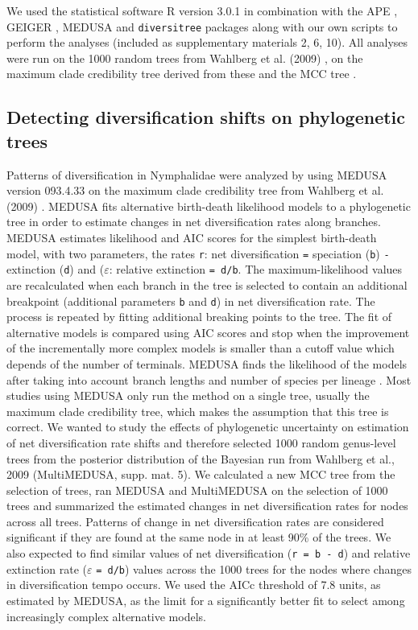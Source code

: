 \documentclass[10pt]{article}
\begin{document}
We used the statistical software R version 3.0.1 \cite{r2013} in combination
with the APE \cite{popescu2012}, GEIGER \cite{harmon2008}, MEDUSA
\cite{alfaro2009} and
\texttt{diversitree} \cite{fitzjohn2012} packages along with our own scripts to
perform the analyses (included as supplementary materials 2, 6, 10). All
analyses were run on the 1000 random trees from Wahlberg et al. (2009)
\cite{wahlberg2009}, on the maximum clade credibility tree derived from these and
the MCC tree \cite{wahlberg2009}.


\subsection*{Detecting diversification shifts on phylogenetic trees}

Patterns of diversification in Nymphalidae were analyzed by using MEDUSA
version 093.4.33 \cite{alfaro2009} on the maximum clade credibility tree from
Wahlberg et al. (2009) \cite{wahlberg2009}. MEDUSA fits alternative birth-death
likelihood models to a phylogenetic tree in order to estimate changes in
net diversification rates along branches. MEDUSA estimates likelihood
and AIC scores for the simplest birth-death model, with two parameters,
the rates \texttt{r}: net diversification \texttt{=} speciation
(\texttt{b}) \texttt{-} extinction (\texttt{d}) and (\(\varepsilon\):
relative extinction \texttt{= d/b}.
The maximum-likelihood values are recalculated when each branch in the tree
is selected to contain an additional breakpoint (additional parameters
\texttt{b} and \texttt{d}) in net diversification rate. 
The process is repeated by fitting additional breaking points to the tree.
The fit of  alternative models is compared using AIC
scores and stop when the improvement of the incrementally more complex models 
is smaller than a cutoff value which
depends of the number of terminals.
MEDUSA finds the likelihood of the models after taking into
account branch lengths and number of species per lineage \cite{alfaro2009}. Most
studies using MEDUSA only run the method on a single tree, usually the
maximum clade credibility tree, which makes the assumption that this
tree is correct. We wanted to study the effects of phylogenetic
uncertainty on estimation of net diversification rate shifts and
therefore selected 1000 random genus-level trees from the posterior
distribution of the Bayesian run from Wahlberg et al., 2009 \cite{wahlberg2009}
(MultiMEDUSA, supp. mat. 5). We calculated a new MCC tree from the
selection of trees, ran MEDUSA and MultiMEDUSA on the selection of 1000
trees and summarized the estimated changes in net diversification rates
for nodes across all trees. Patterns of change in net diversification
rates are considered significant if they are found at the same node in
at least 90\% of the trees. We also expected to find similar values of
net diversification (\texttt{r = b - d}) and relative extinction rate
(\(\varepsilon\) \texttt{= d/b}) values across the 1000 trees for the
nodes where changes in diversification tempo occurs. We used the AICc
threshold of 7.8 units, as estimated by MEDUSA, as the limit for a
significantly better fit to select among increasingly complex
alternative models.
\end{document}
